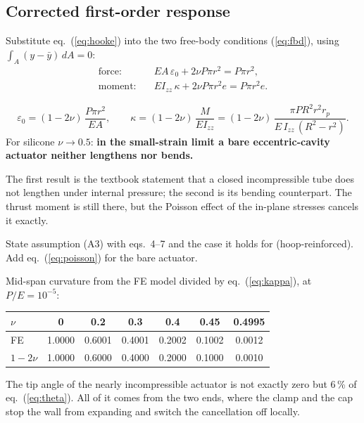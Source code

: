 \documentclass[11pt,a4paper]{article}
\numberwithin{equation}{section}
\newcommand{\Izz}{I_{zz}}
\newcommand{\rp}{r_p}
\begin{document}
\subsection{Corrected first-order response}
Substitute eq.~(\ref{eq:hooke}) into the two free-body conditions (\ref{eq:fbd}), using $\int_A (y-\bar y)\,dA = 0$:
\begin{align}
\text{force:}\quad & EA\,\varepsilon_0 + 2\nu P\pi r^2 = P\pi r^2,\\
\text{moment:}\quad & E\Izz\,\kappa + 2\nu P\pi r^2 e = P\pi r^2 e .
\end{align}
\begin{keyresult}
\begin{equation}
\varepsilon_0 = (1-2\nu)\,\frac{P\pi r^2}{EA},\qquad
\kappa = (1-2\nu)\,\frac{M}{E\Izz} = (1-2\nu)\,\frac{\pi P R^2 r^2 \rp}{E\,\Izz\,(R^2-r^2)} . \label{eq:poisson}
\end{equation}
For silicone $\nu\to 0.5$: \textbf{in the small-strain limit a bare eccentric-cavity actuator neither lengthens nor bends.}
\end{keyresult}

The first result is the textbook statement that a closed incompressible tube does not lengthen under internal pressure;
the second is its bending counterpart. The thrust moment is still there, but the Poisson effect of the in-plane stresses cancels it exactly.

\begin{correction}
State assumption (A3) with eqs.~4--7 and the case it holds for (hoop-reinforced). Add eq.~(\ref{eq:poisson}) for the bare actuator.
\end{correction}

\begin{remark}
Mid-span curvature from the FE model divided by eq.~(\ref{eq:kappa}), at $P/E=10^{-5}$:
\begin{center}\small
\begin{tabular}{@{}lcccccc@{}}
\toprule
$\nu$ & 0 & 0.2 & 0.3 & 0.4 & 0.45 & 0.4995\\
\midrule
FE & 1.0000 & 0.6001 & 0.4001 & 0.2002 & 0.1002 & 0.0012\\
$1-2\nu$ & 1.0000 & 0.6000 & 0.4000 & 0.2000 & 0.1000 & 0.0010\\
\bottomrule
\end{tabular}
\end{center}
The tip angle of the nearly incompressible actuator is not exactly zero but 6\,\% of eq.~(\ref{eq:theta}). All of it comes from the two ends,
where the clamp and the cap stop the wall from expanding and switch the cancellation off locally.
\end{remark}
\end{document}
